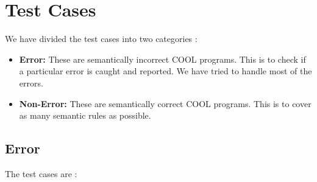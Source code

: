 \documentclass{article}
\begin{document}
\section{Test Cases}
We have divided the test cases into two categories :
\begin{itemize}
    \item \textbf{Error: }These are semantically incorrect COOL programs. This is to check if a particular error is caught and reported. We have tried to handle most of the errors. 
    \item \textbf{Non-Error: }These are semantically correct COOL programs. This is to cover as many semantic rules as possible.
\end{itemize}

\subsection{Error}
The test cases are :
\end{document}
